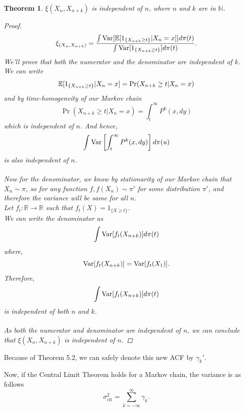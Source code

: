 \documentclass{article}
\newtheorem{theorem}{Theorem}[section]
\begin{document}
	\begin{theorem}
		$\xi(X_n, X_{n+k})$ is independent of $n$, where $n$ and $k$ are in $\mathbb{N}$.
		\begin{proof}
			\begin{equation}
				\xi_{(X_n, X_{n+k})} = \frac{\int \text{Var}[\mathbb{E}[1_{\{X_{n+k} \geq t\}}|X_n=x]] d\pi(t)}{\int \text{Var}[1_{\{X_{n+k} \geq t\}}] d\pi(t)}.
			\end{equation}
			We'll prove that both the numerator and the denominator are independent of $k$. \\
			We can write
			\begin{equation*}
				\mathbb{E}[1_{\{X_{n+k} \geq t\}}|X_n=x] = \Pr(X_{n+k} \geq t|X_n=x) \\
			\end{equation*}
			and by time-homogeneity of our Markov chain
			\begin{equation*}
				\Pr(X_{n+k} \geq t|X_n=x) = \int_t^{\infty} P^k(x, dy)
			\end{equation*}
			which is independent of $n$. And hence,
			\begin{equation}
				\int \text{Var}\left[ \int_t^{\infty} P^k(x, dy)\right] d\pi(u)
			\end{equation}
			is also independent of $n$.\\\\
			Now for the denominator, we know by stationarity of our Markov chain that $X_n \sim \pi$, so for any function $f, f(X_n) \sim \pi'$ for some distribution $\pi'$, and therefore the variance will be same for all $n$.\\
			Let $f_t: \mathbb{R} \rightarrow \mathbb{R}$ such that $f_t(X) = 1_{\{X \geq t\}}$.\\
			We can write the denominator as
			$$\int \text{Var}[f_t(X _{n+k})] d\pi(t)$$
			where,
			$$\text{Var}[f_t(X_{n+k})] = \text{Var}[f_t(X_{1})].$$
			Therefore,
			$$\int \text{Var}[f_t(X_{n+k})] d\pi(t)$$
			is independent of both $n$ and $k$.\\\\
			As both the numerator and denominator are independent of $n$, we can conclude that $\xi(X_n, X_{n+k})$ is independent of $n$.
		\end{proof}
	\end{theorem}
	Because of Theorem 5.2, we can safely denote this new ACF by $\gamma_k'$.

	Now, if the Central Limit Theorem holds for a Markov chain, the variance is as follows
	$$\sigma_{\text{clt}}^2 = \sum_{k=-\infty}^{\infty} \gamma_k.$$
\end{document}

